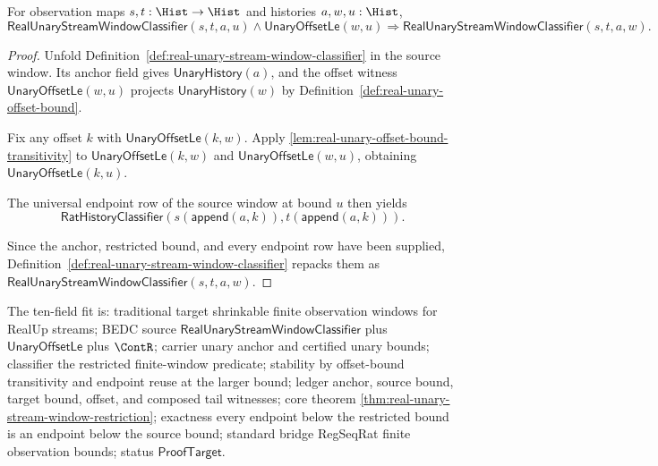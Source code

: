 \begin{theorem}
\label{thm:real-unary-stream-window-restriction}
For observation maps $s,t:\Hist\to\Hist$ and histories $a,w,u:\Hist$,
$$
\mathsf{RealUnaryStreamWindowClassifier}(s,t,a,u)\land
\mathsf{UnaryOffsetLe}(w,u)
\Longrightarrow
\mathsf{RealUnaryStreamWindowClassifier}(s,t,a,w).
$$
\end{theorem}
\begin{proof}
Unfold Definition~\ref{def:real-unary-stream-window-classifier} in the source
window. Its anchor field gives $\mathsf{UnaryHistory}(a)$, and the offset
witness $\mathsf{UnaryOffsetLe}(w,u)$ projects $\mathsf{UnaryHistory}(w)$ by
Definition~\ref{def:real-unary-offset-bound}.

Fix any offset $k$ with $\mathsf{UnaryOffsetLe}(k,w)$. Apply
\autoref{lem:real-unary-offset-bound-transitivity} to
$\mathsf{UnaryOffsetLe}(k,w)$ and $\mathsf{UnaryOffsetLe}(w,u)$, obtaining
$\mathsf{UnaryOffsetLe}(k,u)$.

The universal endpoint row of the source window at bound $u$ then yields
$$
\mathsf{RatHistoryClassifier}(
s(\mathsf{append}(a,k)),t(\mathsf{append}(a,k))).
$$

Since the anchor, restricted bound, and every endpoint row have been supplied,
Definition~\ref{def:real-unary-stream-window-classifier} repacks them as
$\mathsf{RealUnaryStreamWindowClassifier}(s,t,a,w)$.
\end{proof}

The ten-field fit is: traditional target shrinkable finite observation windows
for RealUp streams; BEDC source $\mathsf{RealUnaryStreamWindowClassifier}$ plus
$\mathsf{UnaryOffsetLe}$ plus $\ContR$; carrier unary anchor and certified
unary bounds; classifier the restricted finite-window predicate; stability by
offset-bound transitivity and endpoint reuse at the larger bound; ledger
anchor, source bound, target bound, offset, and composed tail witnesses; core
theorem \autoref{thm:real-unary-stream-window-restriction}; exactness every
endpoint below the restricted bound is an endpoint below the source bound;
standard bridge RegSeqRat finite observation bounds; status
$\mathsf{ProofTarget}$.

